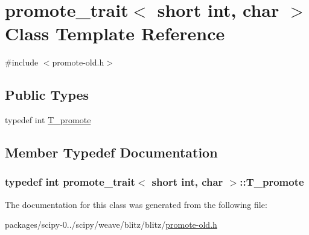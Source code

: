 \hypertarget{classpromote__trait_3_01short_01int_00_01char_01_4}{}\section{promote\+\_\+trait$<$ short int, char $>$ Class Template Reference}
\label{classpromote__trait_3_01short_01int_00_01char_01_4}


{\ttfamily \#include $<$promote-\/old.\+h$>$}

\subsection*{Public Types}
\begin{DoxyCompactItemize}
\item 
typedef int \hyperlink{classpromote__trait_3_01short_01int_00_01char_01_4_aa4fd8e13c8e791656c4bd4616a472bb4}{T\+\_\+promote}
\end{DoxyCompactItemize}


\subsection{Member Typedef Documentation}
\hypertarget{classpromote__trait_3_01short_01int_00_01char_01_4_aa4fd8e13c8e791656c4bd4616a472bb4}{}
\subsubsection[{T\+\_\+promote}]{\setlength{\rightskip}{0pt plus 5cm}typedef int {\bf promote\+\_\+trait}$<$ short int, char $>$\+::{\bf T\+\_\+promote}}\label{classpromote__trait_3_01short_01int_00_01char_01_4_aa4fd8e13c8e791656c4bd4616a472bb4}


The documentation for this class was generated from the following file\+:\begin{DoxyCompactItemize}
\item 
packages/scipy-\/0../scipy/weave/blitz/blitz/\hyperlink{promote-old_8h}{promote-\/old.\+h}\end{DoxyCompactItemize}
